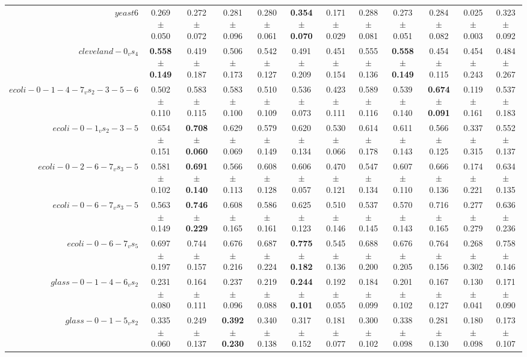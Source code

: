 \begin{table}[!ht]
{\begin{tabular}{r c c c c c c c c c c c}
$yeast6$ & 0.269 $\pm$ 0.050 & 0.272 $\pm$ 0.072 & 0.281 $\pm$ 0.096 & 0.280 $\pm$ 0.061 & \textbf{0.354 $\pm$ 0.070} & 0.171 $\pm$ 0.029 & 0.288 $\pm$ 0.081 & 0.273 $\pm$ 0.051 & 0.284 $\pm$ 0.082 & 0.025 $\pm$ 0.003 & 0.323 $\pm$ 0.092 \\
$cleveland-0_vs_4$ & \textbf{0.558 $\pm$ 0.149} & 0.419 $\pm$ 0.187 & 0.506 $\pm$ 0.173 & 0.542 $\pm$ 0.127 & 0.491 $\pm$ 0.209 & 0.451 $\pm$ 0.154 & 0.555 $\pm$ 0.136 & \textbf{0.558 $\pm$ 0.149} & 0.454 $\pm$ 0.115 & 0.454 $\pm$ 0.243 & 0.484 $\pm$ 0.267 \\
$ecoli-0-1-4-7_vs_2-3-5-6$ & 0.502 $\pm$ 0.110 & 0.583 $\pm$ 0.115 & 0.583 $\pm$ 0.100 & 0.510 $\pm$ 0.109 & 0.536 $\pm$ 0.073 & 0.423 $\pm$ 0.111 & 0.589 $\pm$ 0.116 & 0.539 $\pm$ 0.140 & \textbf{0.674 $\pm$ 0.091} & 0.119 $\pm$ 0.161 & 0.537 $\pm$ 0.183 \\
$ecoli-0-1_vs_2-3-5$ & 0.654 $\pm$ 0.151 & \textbf{0.708 $\pm$ 0.060} & 0.629 $\pm$ 0.069 & 0.579 $\pm$ 0.149 & 0.620 $\pm$ 0.134 & 0.530 $\pm$ 0.066 & 0.614 $\pm$ 0.178 & 0.611 $\pm$ 0.143 & 0.566 $\pm$ 0.125 & 0.337 $\pm$ 0.315 & 0.552 $\pm$ 0.137 \\
$ecoli-0-2-6-7_vs_3-5$ & 0.581 $\pm$ 0.102 & \textbf{0.691 $\pm$ 0.140} & 0.566 $\pm$ 0.113 & 0.608 $\pm$ 0.128 & 0.606 $\pm$ 0.057 & 0.470 $\pm$ 0.121 & 0.547 $\pm$ 0.134 & 0.607 $\pm$ 0.110 & 0.666 $\pm$ 0.136 & 0.174 $\pm$ 0.221 & 0.634 $\pm$ 0.135 \\
$ecoli-0-6-7_vs_3-5$ & 0.563 $\pm$ 0.149 & \textbf{0.746 $\pm$ 0.229} & 0.608 $\pm$ 0.165 & 0.586 $\pm$ 0.161 & 0.625 $\pm$ 0.123 & 0.510 $\pm$ 0.146 & 0.537 $\pm$ 0.145 & 0.570 $\pm$ 0.143 & 0.716 $\pm$ 0.165 & 0.277 $\pm$ 0.279 & 0.636 $\pm$ 0.236 \\
$ecoli-0-6-7_vs_5$ & 0.697 $\pm$ 0.197 & 0.744 $\pm$ 0.157 & 0.676 $\pm$ 0.216 & 0.687 $\pm$ 0.224 & \textbf{0.775 $\pm$ 0.182} & 0.545 $\pm$ 0.136 & 0.688 $\pm$ 0.200 & 0.676 $\pm$ 0.205 & 0.764 $\pm$ 0.156 & 0.268 $\pm$ 0.302 & 0.758 $\pm$ 0.146 \\
$glass-0-1-4-6_vs_2$ & 0.231 $\pm$ 0.080 & 0.164 $\pm$ 0.111 & 0.237 $\pm$ 0.096 & 0.219 $\pm$ 0.088 & \textbf{0.244 $\pm$ 0.101} & 0.192 $\pm$ 0.055 & 0.184 $\pm$ 0.099 & 0.201 $\pm$ 0.102 & 0.167 $\pm$ 0.127 & 0.130 $\pm$ 0.041 & 0.171 $\pm$ 0.090 \\
$glass-0-1-5_vs_2$ & 0.335 $\pm$ 0.060 & 0.249 $\pm$ 0.137 & \textbf{0.392 $\pm$ 0.230} & 0.340 $\pm$ 0.138 & 0.317 $\pm$ 0.152 & 0.181 $\pm$ 0.077 & 0.300 $\pm$ 0.102 & 0.338 $\pm$ 0.098 & 0.281 $\pm$ 0.130 & 0.180 $\pm$ 0.098 & 0.173 $\pm$ 0.107 \\

\end{tabular}}
\end{table}
